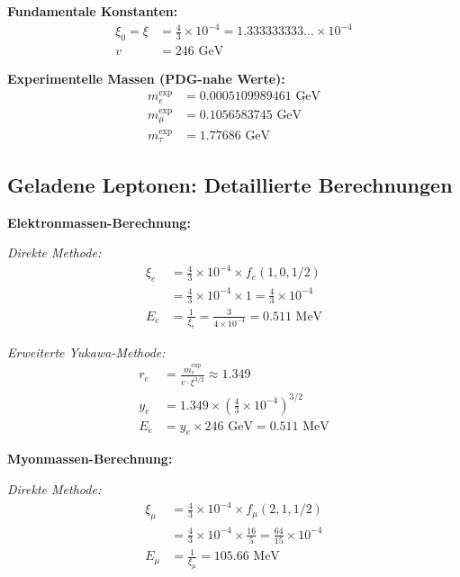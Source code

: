 	\textbf{Fundamentale Konstanten:}
	\begin{align}
		\xi_0 = \xi &= \frac{4}{3} \times 10^{-4} = 1.333333333\ldots \times 10^{-4} \\
		v &= 246 \text{ GeV}
	\end{align}
	
	\textbf{Experimentelle Massen (PDG-nahe Werte):}
	\begin{align}
		m_e^{\text{exp}} &= 0.0005109989461 \text{ GeV} \\
		m_\mu^{\text{exp}} &= 0.1056583745 \text{ GeV} \\
		m_\tau^{\text{exp}} &= 1.77686 \text{ GeV}
	\end{align}
	
	\subsection{Geladene Leptonen: Detaillierte Berechnungen}
	\label{subsec:charged_leptons_detailed}
	
	\textbf{Elektronmassen-Berechnung:}
	
	\textit{Direkte Methode:}
	\begin{align}
		\xi_e &= \frac{4}{3} \times 10^{-4} \times f_e(1,0,1/2) \\
		&= \frac{4}{3} \times 10^{-4} \times 1 = \frac{4}{3} \times 10^{-4} \\
		E_{e} &= \frac{1}{\xi_e} = \frac{3}{4 \times 10^{-4}} = 0.511 \text{ MeV}
	\end{align}
	
	\textit{Erweiterte Yukawa-Methode:}
	\begin{align}
		r_e &= \frac{m_e^{\text{exp}}}{v \cdot \xi^{3/2}} \approx 1.349 \\
		y_e &= 1.349 \times \left(\frac{4}{3} \times 10^{-4}\right)^{3/2} \\
		E_e &= y_e \times 246 \text{ GeV} = 0.511 \text{ MeV}
	\end{align}
	
	\textbf{Myonmassen-Berechnung:}
	
	\textit{Direkte Methode:}
	\begin{align}
		\xi_\mu &= \frac{4}{3} \times 10^{-4} \times f_\mu(2,1,1/2) \\
		&= \frac{4}{3} \times 10^{-4} \times \frac{16}{5} = \frac{64}{15} \times 10^{-4} \\
		E_{\mu} &= \frac{1}{\xi_\mu} = 105.66 \text{ MeV}
	\end{align}
	
